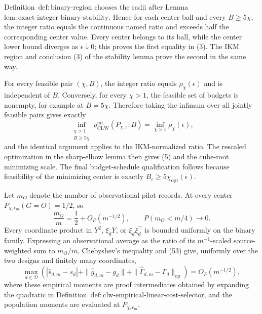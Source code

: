 Definition~\(\mathrm{def{:}binary\text{-}region}\) chooses the radii after Lemma~\(\mathrm{lem{:}exact\text{-}integer\text{-}binary\text{-}stability}\).  Hence for each center ball and every \(B\ge5\chi\), the integer ratio equals the continuous named ratio and exceeds half the corresponding center value.  Every center belongs to its ball, while the center lower bound diverges as \(\epsilon\downarrow0\); this proves the first equality in (3).  The IKM region and conclusion (3) of the stability lemma prove the second in the same way.

For every feasible pair \((\chi,B)\), the integer ratio equals \(\rho_\chi(\epsilon)\) and is independent of \(B\).  Conversely, for every \(\chi>1\), the feasible set of budgets is nonempty, for example at \(B=5\chi\).  Therefore taking the infimum over all jointly feasible pairs gives exactly
\[
 \inf_{\substack{\chi>1\\B\ge5\chi}}
 \rho_{\mathrm{CLW}}^{\mathrm{int}}(P_{\chi,\epsilon};B)
 =\inf_{\chi>1}\rho_\chi(\epsilon),
\]
and the identical argument applies to the IKM-normalized ratio.  The rescaled optimization in the sharp-elbow lemma then gives (5) and the cube-root minimizing scale.  The final budget-schedule qualification follows because feasibility of the minimizing center is exactly \(B_\epsilon\ge5\chi_{\mathrm{opt}}(\epsilon)\).

Let \(m_O\) denote the number of observational pilot records.  At every center \(P_{\chi,\epsilon_m}(G=O)=1/2\), so
\[
 \frac{m_O}{m}=\frac12+O_P(m^{-1/2}),
 \qquad P(m_O<m/4)\longrightarrow0.                       \tag{53}
\]
Every coordinate product in \(Y^2\), \(\xi_dY\), or \(\xi_d\xi_d^\top\) is bounded uniformly on the binary family.  Expressing an observational average as the ratio of its \(m^{-1}\)-scaled source-weighted sum to \(m_O/m\), Chebyshev's inequality and (53) give, uniformly over the two designs and finitely many coordinates,
\[
 \max_{d\in\mathcal D}\left(
 |\widehat s_{d,m}-s_d|
 +\|\widehat g_{d,m}-g_d\|
 +\|\widehat\Gamma_{d,m}-\Gamma_d\|_{\mathrm{op}}
 \right)=O_P(m^{-1/2}),                                   \tag{54}
\]
where these empirical moments are proof intermediates obtained by expanding the quadratic in Definition~\(\mathrm{def{:}clw\text{-}empirical\text{-}linear\text{-}cost\text{-}selector}\), and the population moments are evaluated at \(P_{\chi,\epsilon_m}\).

